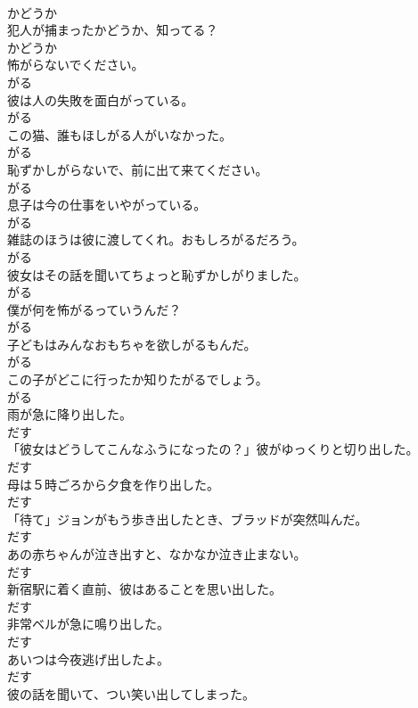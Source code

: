 \documentclass[8pt]{extreport}
\begin{document}
\begin{CJK}{UTF8}{min}
\\	かどうか	
\\	犯人が捕まったかどうか、知ってる？	
\\	かどうか	
\\	怖がらないでください。	
\\	がる	
\\	彼は人の失敗を面白がっている。	
\\	がる	
\\	この猫、誰もほしがる人がいなかった。	
\\	がる	
\\	恥ずかしがらないで、前に出て来てください。	
\\	がる	
\\	息子は今の仕事をいやがっている。	
\\	がる	
\\	雑誌のほうは彼に渡してくれ。おもしろがるだろう。	
\\	がる	
\\	彼女はその話を聞いてちょっと恥ずかしがりました。	
\\	がる	
\\	僕が何を怖がるっていうんだ？	
\\	がる	
\\	子どもはみんなおもちゃを欲しがるもんだ。	
\\	がる	
\\	この子がどこに行ったか知りたがるでしょう。	
\\	がる	
\\	雨が急に降り出した。	
\\	だす	
\\	「彼女はどうしてこんなふうになったの？」彼がゆっくりと切り出した。	
\\	だす	
\\	母は５時ごろから夕食を作り出した。	
\\	だす	
\\	「待て」ジョンがもう歩き出したとき、ブラッドが突然叫んだ。	
\\	だす	
\\	あの赤ちゃんが泣き出すと、なかなか泣き止まない。	
\\	だす	
\\	新宿駅に着く直前、彼はあることを思い出した。	
\\	だす	
\\	非常ベルが急に鳴り出した。	
\\	だす	
\\	あいつは今夜逃げ出したよ。	
\\	だす	
\\	彼の話を聞いて、つい笑い出してしまった。	

\end{CJK}
\end{document}
